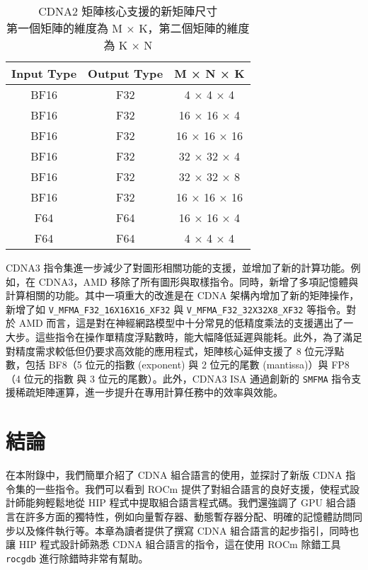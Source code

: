 \begin{table}[h!]
\centering
\caption{CDNA2 矩陣核心支援的新矩陣尺寸\\
第一個矩陣的維度為 M × K，第二個矩陣的維度為 K × N}
\label{tab:matrix_sizes_cdna2}
\begin{tabular}{ccc}
\hline
\textbf{Input Type} & \textbf{Output Type} & \textbf{M × N × K} \\ \hline
BF16 & F32 & 4 × 4 × 4 \\
BF16 & F32 & 16 × 16 × 4 \\
BF16 & F32 & 16 × 16 × 16 \\
BF16 & F32 & 32 × 32 × 4 \\
BF16 & F32 & 32 × 32 × 8 \\
BF16 & F32 & 16 × 16 × 16 \\
F64  & F64 & 16 × 16 × 4 \\
F64  & F64 & 4 × 4 × 4 \\
\hline
\end{tabular}
\end{table}

CDNA3 指令集進一步減少了對圖形相關功能的支援，並增加了新的計算功能。例如，在 CDNA3，AMD 移除了所有圖形與取樣指令。同時，新增了多項記憶體與計算相關的功能。其中一項重大的改進是在 CDNA 架構內增加了新的矩陣操作，新增了如 \lstinline|V_MFMA_F32_16X16X16_XF32| 與 \lstinline|V_MFMA_F32_32X32X8_XF32| 等指令。對於 AMD 而言，這是對在神經網路模型中十分常見的低精度乘法的支援邁出了一大步。這些指令在操作單精度浮點數時，能大幅降低延遲與能耗。此外，為了滿足對精度需求較低但仍要求高效能的應用程式，矩陣核心延伸支援了 8 位元浮點數，包括 BF8（5 位元的指數 (exponent) 與 2 位元的尾數 (mantissa)）與 FP8（4 位元的指數 與 3 位元的尾數）。此外，CDNA3 ISA 通過創新的 \lstinline|SMFMA| 指令支援稀疏矩陣運算，進一步提升在專用計算任務中的效率與效能。


\section{結論}
在本附錄中，我們簡單介紹了 CDNA 組合語言的使用，並探討了新版 CDNA 指令集的一些指令。我們可以看到 ROCm 提供了對組合語言的良好支援，使程式設計師能夠輕鬆地從 HIP 程式中提取組合語言程式碼。我們還強調了 GPU 組合語言在許多方面的獨特性，例如向量暫存器、動態暫存器分配、明確的記憶體訪問同步以及條件執行等。本章為讀者提供了撰寫 CDNA 組合語言的起步指引，同時也讓 HIP 程式設計師熟悉 CDNA 組合語言的指令，這在使用 ROCm 除錯工具 \lstinline|rocgdb| 進行除錯時非常有幫助。
